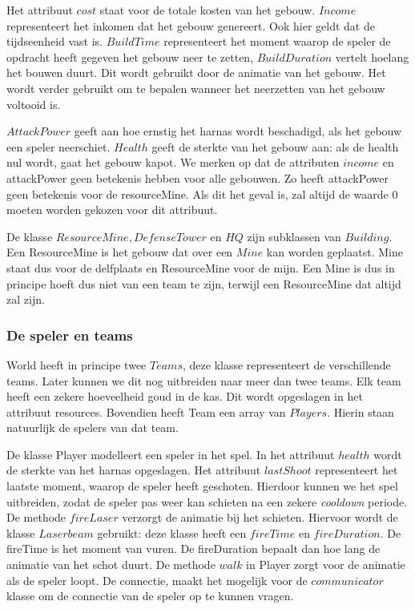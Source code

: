 \documentclass[a4paper,11pt]{article}
\begin{document}
Het attribuut $cost$ staat voor de totale kosten van het gebouw. $Income$ representeert het inkomen dat het gebouw genereert. Ook hier geldt dat de tijdseenheid vast is. $BuildTime$ representeert het moment waarop de speler de opdracht heeft gegeven het gebouw neer te zetten, $BuildDuration$ vertelt hoelang het bouwen duurt. Dit wordt gebruikt door de animatie van het gebouw. Het wordt verder gebruikt om te bepalen wanneer het neerzetten van het gebouw voltooid is.

$AttackPower$ geeft aan hoe ernstig het harnas wordt beschadigd, als het gebouw een speler neerschiet. $Health$ geeft de sterkte van het gebouw aan: als de health nul wordt, gaat het gebouw kapot. We merken op dat de attributen $income$ en attackPower geen betekenis hebben voor alle gebouwen. Zo heeft attackPower geen betekenis voor de resourceMine. Als dit het geval is, zal altijd de waarde 0 moeten worden gekozen voor dit attribuut.

De klasse $ResourceMine, DefenseTower$ en $HQ$ zijn subklassen van $Building$. Een ResourceMine is het gebouw dat over een $Mine$ kan worden geplaatst. Mine staat dus voor de delfplaats en ResourceMine voor de mijn. Een Mine is dus in principe hoeft dus niet van een team te zijn, terwijl een ResourceMine dat altijd zal zijn.

\subsubsection{De speler en teams}
World heeft in principe twee $Teams$, deze klasse representeert de verschillende teams. Later kunnen we dit nog uitbreiden naar meer dan twee teams. Elk team heeft een zekere hoeveelheid goud in de kas. Dit wordt opgeslagen in het attribuut resources. Bovendien heeft Team een array van $Players$. Hierin staan natuurlijk de spelers van dat team.

De klasse Player modelleert een speler in het spel. In het attribuut $health$ wordt de sterkte van het harnas opgeslagen. Het attribuut $lastShoot$ representeert het laatste moment, waarop de speler heeft geschoten. Hierdoor kunnen we het spel uitbreiden, zodat de speler pas weer kan schieten na een zekere \emph{cooldown} periode. De methode $fireLaser$ verzorgt de animatie bij het schieten. Hiervoor wordt de klasse $Laserbeam$ gebruikt: deze klasse heeft een $fireTime$ en $fireDuration$. De fireTime is het moment van vuren. De fireDuration bepaalt dan hoe lang de animatie van het schot duurt. De methode $walk$ in Player zorgt voor de animatie als de speler loopt. De connectie, maakt het mogelijk voor de $communicator$ klasse om de connectie van de speler op te kunnen vragen.
\end{document}
